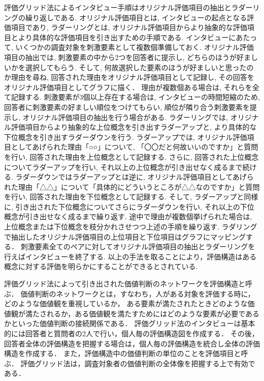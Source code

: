 \documentclass[syuuron]{kuee}
\begin{document}
		評価グリッド法によるインタビュー手順はオリジナル評価項目の抽出とラダーリングの繰り返しである. 
		オリジナル評価項目とは, インタビューの起点となる評価項目であり, 
		ラダーリングとは, オリジナル評価項目からより抽象的な評価項目とより具体的な評価項目を引き出すための手順である. 
		インタビューにあたって, いくつかの調査対象を刺激要素として複数個準備しておく. 
		オリジナル評価項目の抽出では, 刺激要素の中から2つを回答者に提示し, どちらのほうが好ましいかを選択してもらう. 
		そして, 何故選択した要素のほうが好ましいと思ったのか理由を尋ね, 回答された理由をオリジナル評価項目として記録し, その回答をオリジナル評価項目としてグラフに描く．
		理由が複数個ある場合は, それらを全て記録する. 
		刺激要素が3個以上存在する場合は, インタビューの時間短縮のため, 回答者に刺激要素の好ましい順位をつけてもらい, 順位が隣り合う刺激要素を提示し, 
		オリジナル評価項目の抽出を行う場合がある. 
		ラダーリングでは, オリジナル評価項目からより抽象的な上位概念を引き出すラダーアップと, より具体的な下位概念を引き出すラダーダウンを行う. 
		ラダーアップでは, オリジナル評価項目としてあげられた理由「○○」について, 「〇〇だと何故いいのですか」と質問を行い, 回答された理由を上位概念として記録する. 
		さらに, 回答された上位概念についてラダーアップを行い, それ以上の上位概念が引き出せなく成るまで続ける. 
		ラダーダウンではラダーアップとは逆に, オリジナル評価項目としてあげられた理由「△△」について「具体的にどういうところが△△なのですか」と質問を行い, 
		回答された理由を下位概念として記録する. 
		そして, ラダーアップと同様に, 引き出された下位概念についてさらにラダーダウンを行い, それ以上の下位概念が引き出せなく成るまで繰り返す. 
		途中で理由が複数個挙げられた場合は, 上位概念または下位概念を枝分かれさせつつ上述の手順を繰り返す. 
		ラダリングで抽出したオリジナル評価項目の上位項目と下位項目はグラフにマッピングする．
		刺激要素全てのペアに対してオリジナル評価項目の抽出とラダーリングを行えばインタビューを終了する. 
		以上の手法を取ることにより，評価構造はある概念に対する評価を明らかにすることができるとされている. 
		
		評価グリッド法によって引き出された価値判断のネットワークを評価構造と呼ぶ．
		価値判断のネットワークとは，すなわち，人がある対象を評価する時に，どのような価値観を重視しているか，
		ある要素が満たされたときどのような価値観が満たされるか，ある価値観を満たすためにはどのような要素が必要であるかといった価値判断の接続関係である．
		評価グリッド法のインタビューは基本的には回答者と質問者の2人で行い，個人毎の評価構造図を作成する．
		その後，回答者全体の評価構造を把握する場合は，個人毎の評価構造を統合し全体の評価構造を作成する．
		また，評価構造中の価値判断の単位のことを評価項目と呼ぶ．
		評価グリッド法は，調査対象者の価値判断の全体像を把握する上で有効である．
		
\end{document}
